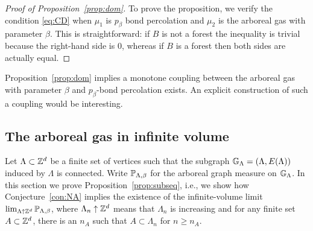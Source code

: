 \documentclass[11pt]{amsart}
\numberwithin{equation}{section}
\numberwithin{theorem}{section}
\begin{document}
\begin{proof}[Proof of Proposition~\ref{prop:dom}]
  To prove the proposition, we verify the condition
  \eqref{eq:CD} when $\mu_{1}$ is $p_{\beta}$ bond
  percolation and $\mu_{2}$ is the arboreal gas with parameter
  $\beta$. This is straightforward: if $B$ is not a forest the inequality is trivial because
  the right-hand side is $0$, whereas if $B$ is a forest then both
  sides are actually equal.
\end{proof}

\begin{remark}
  \label{rem:coupling}
  Proposition~\ref{prop:dom} implies a monotone coupling between the
  arboreal gas with parameter $\beta$ and $p_{\beta}$-bond
  percolation exists. An explicit construction of such a coupling would be
  interesting.
\end{remark}

\subsection{The arboreal gas in infinite volume}
\label{sec:arbor-gas-infin}

Let $\Lambda \subset \Z^{d}$ be a finite set of vertices such that the
subgraph $\bbG_{\Lambda}=(\Lambda, E(\Lambda))$ induced by $\Lambda$ is
connected. Write $\P_{\Lambda,\beta}$ for the arboreal graph measure
on $\bbG_{\Lambda}$. In this section we prove
Proposition~\ref{prop:subseq}, i.e., we show how
Conjecture~\ref{con:NA} implies the existence of the infinite-volume
limit $\lim_{\Lambda\uparrow \Z^{d}}\P_{\Lambda,\beta}$, where
$\Lambda_{n}\uparrow \Z^{d}$ means that $\Lambda_{n}$ is increasing
and for any finite set $A\subset \Z^{d}$, there is an $n_{A}$ such
that $A\subset \Lambda_{n}$ for $n\geq n_{A}$.
\end{document}
